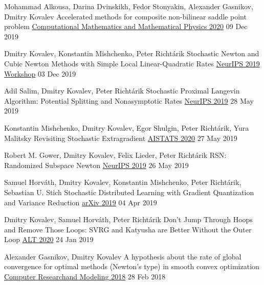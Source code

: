 \begin{cventries}
\cventry
{Mohammad Alkousa, Darina Dvinskikh, Fedor Stonyakin, Alexander Gasnikov, Dmitry Kovalev} %
{Accelerated methods for composite non-bilinear saddle point problem} %
{\href{https://link.springer.com/article/10.1134/S0965542520110020}{Computational Mathematics and Mathematical Physics 2020}} 
{09 Dec 2019} %
{}	

\cventry
{Dmitry Kovalev, Konstantin Mishchenko, Peter Richtárik} %
{Stochastic Newton and Cubic Newton Methods with Simple Local Linear-Quadratic Rates} %
{\href{https://sites.google.com/site/optneurips19/}{NeurIPS 2019 Workshop}} 
{03 Dec 2019} %
{}	

\cventry
{Adil Salim, Dmitry Kovalev, Peter Richtárik} %
{Stochastic Proximal Langevin Algorithm: Potential Splitting and Nonasymptotic Rates} %
{\href{https://papers.nips.cc/paper/8891-stochastic-proximal-langevin-algorithm-potential-splitting-and-nonasymptotic-rates}{NeurIPS 2019}} 
{28 May 2019} %
{}	

\cventry
{Konstantin Mishchenko, Dmitry Kovalev, Egor Shulgin, Peter Richtárik, Yura Malitsky} %
{Revisiting Stochastic Extragradient} %
{\href{http://proceedings.mlr.press/v108/mishchenko20a}{AISTATS 2020}} 
{27 May 2019} %
{}	

\cventry
{Robert M. Gower, Dmitry Kovalev, Felix Lieder, Peter Richtárik} %
{RSN: Randomized Subspace Newton} %
{\href{https://papers.nips.cc/paper/8351-rsn-randomized-subspace-newton}{NeurIPS 2019}} 
{26 May 2019} %
{}	


\cventry
{Samuel Horváth, Dmitry Kovalev, Konstantin Mishchenko, Peter Richtárik, Sebastian U. Stich} %
{Stochastic Distributed Learning with Gradient Quantization and Variance Reduction} %
{\href{https://arxiv.org/abs/1904.05115}{arXiv 2019}} 
{04 Apr 2019} %
{}	

\cventry
{Dmitry Kovalev, Samuel Horváth, Peter Richtárik} %
{Don't Jump Through Hoops and Remove Those Loops: SVRG and Katyusha are Better Without the Outer Loop} %
{\href{http://proceedings.mlr.press/v117/kovalev20a}{ALT 2020}} 
{24 Jan 2019} %
{}	

\cventry
{Alexander Gasnikov, Dmitry Kovalev} %
{A hypothesis about the rate of global convergence for optimal methods (Newton's type) in smooth convex optimization} %
{\href{http://www.mathnet.ru/php/archive.phtml?wshow=paper\&jrnid=crm\&paperid=253\&option\_lang=eng}{
						Computer Research\linebreak and Modeling  2018}} 
{28 Feb 2018} %
{}	


\end{cventries}
